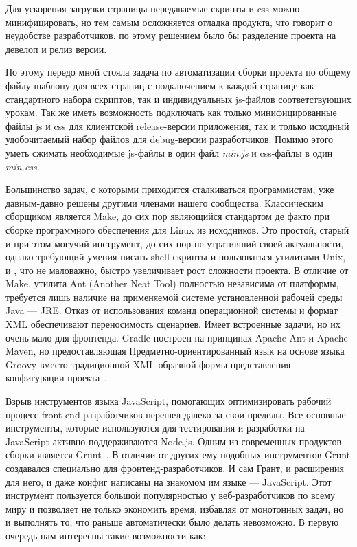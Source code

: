 Для ускорения загрузки страницы передаваемые скрипты и css можно минифицировать, но тем самым осложняется отладка продукта, что говорит о неудобстве разработчиков. по этому решением было бы разделение проекта на девелоп и релиз версии.

По этому передо мной стояла задача по автоматизации сборки проекта по общему файлу-шаблону для всех страниц с подключением к каждой странице как стандартного набора скриптов, так и индивидуальных js-файлов соответствующих урокам. Так же иметь возможность подключать как только минифицированные файлы js и css для клиентской release-версии приложения, так и  только исходный удобочитаемый набор файлов для debug-версии разработчиков. Помимо этого уметь сжимать необходимые js-файлы в один файл \textit{min.js} и css-файлы в один \textit{min.css}.

Большинство задач, с которыми приходится сталкиваться программистам, уже давным-давно решены другими членами нашего сообщества. Классическим сборщиком является Make, до сих пор являющийся стандартом де факто при сборке программного обеспечения для Linux из исходников. Это простой, старый и при этом могучий инструмент, до сих пор не утративший своей актуальности, однако требующий умения писать shell-скрипты и пользоваться утилитами Unix, и , что не маловажно, быстро увеличивает рост сложности проекта. В отличие от Make, утилита Ant (Another Neat Tool)  полностью независима от платформы, требуется лишь наличие на применяемой системе установленной рабочей среды Java — JRE. Отказ от использования команд операционной системы и формат XML обеспечивают переносимость сценариев. Имеет встроенные задачи, но их очень мало для фронтенда. Gradle-построен на принципах Apache Ant и Apache Maven, но предоставляющая Предметно-ориентированный язык на основе языка Groovy вместо традиционной XML-образной формы представления конфигурации проекта~\cite{make1, make2, make3, ant1, ant2, gradle1, gradle2}.

Взрыв инструментов языка JavaScript, помогающих оптимизировать рабочий процесс front-end-разработчиков  перешел далеко за свои пределы. Все основные инструменты, которые используются для тестирования и разработки на JavaScript активно поддерживаются Node.js. Одним из современных продуктов сборки является Grunt~\cite{grunt1, grunt2, grunt3, grunt4, grunt5}. В отличии от других ему подобных инструментов Grunt создавался специально для фронтенд-разработчиков. И сам Грант, и расширения для него, и даже конфиг написаны на знакомом им языке --- JavaScript. Этот инструмент пользуется большой популярностью у веб-разработчиков по всему миру и позволяет не только экономить время, избавляя от монотонных задач, но и выполнять то, что раньше автоматически было делать невозможно. В первую очередь нам интересны такие возможности как:


